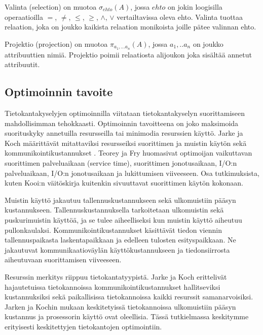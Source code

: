 \documentclass[finnish]{tktltiki2}
\theoremstyle{definition}
\theoremstyle{remark}
\begin{document}
Valinta (selection) on muotoa $\sigma_{ehto}(A)$, jossa $ehto$ on jokin loogisilla operaatioilla $=$, $\neq$, $\leq$, $\geq$, $\wedge$, $\vee$ vertailtavissa oleva ehto. Valinta tuottaa relaation, joka on joukko kaikista relaation monikoista joille pätee valinnan ehto.	

Projektio (projection) on muotoa $\pi_{a_1,...a_n}(A)$, jossa $a_1,..a_n$ on joukko attribuuttien nimiä. Projektio poimii relaatiosta alijoukon joka sisältää annetut attribuutit.


\subsection{Optimoinnin tavoite}
Tietokantakyselyjen optimoinnilla viitataan tietokantakyselyn suorittamiseen mahdollisimman tehokkaasti. Optimoinnin tavoitteena on joko maksimoida suorituskyky annetuilla resursseilla tai minimodia resurssien käyttö. Jarke ja Koch määrittävät mitattaviksi resursseiksi suorittimen ja muistin käytön sekä kommunikointikustannukset \cite{jarke1984}. Teorey ja Fry \cite{teorey1982design} huomasivat optimoijan vaikuttavan suorittimen palveluaikaan (service time), suorittimen jonotusaikaan, I/O:n palveluaikaan, I/O:n jonotusaikaan ja lukittumisen viiveeseen. Osa tutkimuksista, kuten Kooi:n väitöskirja \cite{kooi1980optimization} kuitenkin sivuuttavat suorittimen käytön kokonaan.

Muistin käyttö jakautuu tallennuskustannukseen sekä ulkomuistiin pääsyn kustannukseen. Tallennuskustannuksella tarkoitetaan ulkomuistin sekä puskurimuistin käyttöä, ja se tulee aiheelliseksi kun muistin käyttö aiheutuu pullonkaulaksi. Kommunikointikustannukset käsittävät tiedon viennin tallennuspaikasta laskentapaikkaan ja edelleen tulosten esityspaikkaan. Ne jakautuvat kommunikaatioväylän käyttökustannukseen ja tiedonsiirrosta aiheutuvaan suorittamisen viiveeseen.

Resurssin merkitys riippuu tietokantatyypistä. Jarke ja Koch erittelivät hajautetuissa tietokannoissa kommunikointikustannukset hallitseviksi kustannuksiksi sekä paikallisissa tietokannoissa kaikki resurssit samanarvoisiksi. Jarken ja Kochin mukaan keskitetyissä tietokannoissa ulkomuistiin pääsyn kustannus ja prosessorin käyttö ovat oleellisia. Tässä tutkielmassa keskitymme erityisesti keskitettyjen tietokantojen optimointiin.
\end{document}
